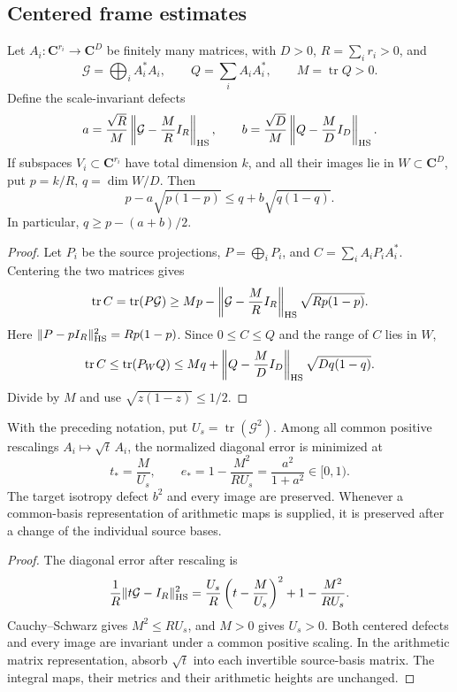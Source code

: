 

\subsection{Centered frame estimates}

\begin{lemma}\label{cs-centered-rank}
Let $A_i:\mathbf C^{r_i}\to\mathbf C^D$ be finitely many matrices,
with $D>0$, $R=\sum_i r_i>0$, and
\[
 \mathcal G=\bigoplus_iA_i^*A_i,\qquad
 Q=\sum_iA_iA_i^*,\qquad M=\operatorname{tr}Q>0.
\]
Define the scale-invariant defects
\[
 a=\frac{\sqrt R}{M}
       \left\|\mathcal G-\frac MR I_R\right\|_{\rm HS},
 \qquad
 b=\frac{\sqrt D}{M}
       \left\|Q-\frac MD I_D\right\|_{\rm HS}.
\]
If subspaces $V_i\subset\mathbf C^{r_i}$ have total dimension $k$,
and all their images lie in $W\subset\mathbf C^D$, put
$p=k/R$, $q=\dim W/D$. Then
\begin{equation}\label{eq:cs-centered-rank}
 p-a\sqrt{p(1-p)}\le q+b\sqrt{q(1-q)}.
\end{equation}
In particular, $q\ge p-(a+b)/2$.
\end{lemma}
\begin{proof}
Let $P_i$ be the source projections, $P=\bigoplus_iP_i$, and
$C=\sum_iA_iP_iA_i^*$. Centering the two matrices gives
\[
 \operatorname{tr}C=\operatorname{tr}(P\mathcal G)
 \ge Mp-\left\|\mathcal G-\frac MR I_R\right\|_{\rm HS}
                   \sqrt{Rp(1-p)}.
\]
Here $\|P-pI_R\|_{\rm HS}^2=Rp(1-p)$.
Since $0\le C\le Q$ and the range of $C$ lies in $W$,
\[
 \operatorname{tr}C\le\operatorname{tr}(P_WQ)
 \le Mq+\left\|Q-\frac MD I_D\right\|_{\rm HS}
                   \sqrt{Dq(1-q)}.
\]
Divide by $M$ and use $\sqrt{z(1-z)}\le1/2$.
\end{proof}

\begin{proposition}
\label{cs-optimal-normalization}
With the preceding notation, put $U_s=\operatorname{tr}(\mathcal G^2)$.
Among all common positive rescalings $A_i\mapsto\sqrt t\,A_i$,
the normalized diagonal error is minimized at
\[
 t_*=\frac M{U_s},\qquad
 e_*=1-\frac{M^2}{RU_s}=\frac{a^2}{1+a^2}\in[0,1).
\]
The target isotropy defect $b^2$ and every image are preserved.
Whenever a common-basis representation of arithmetic maps is supplied,
it is preserved after a change of the individual source bases.
\end{proposition}
\begin{proof}
The diagonal error after rescaling is
\[
 \frac1R\|t\mathcal G-I_R\|_{\rm HS}^2
 =\frac{U_s}{R}\left(t-\frac M{U_s}\right)^2
       +1-\frac{M^2}{RU_s}.
\]
Cauchy--Schwarz gives $M^2\le RU_s$, and $M>0$ gives $U_s>0$.
Both centered defects and every image are invariant under a common
positive scaling. In the arithmetic matrix representation, absorb
$\sqrt t$ into each invertible source-basis matrix. The integral maps,
their metrics and their arithmetic heights are unchanged.
\end{proof}

